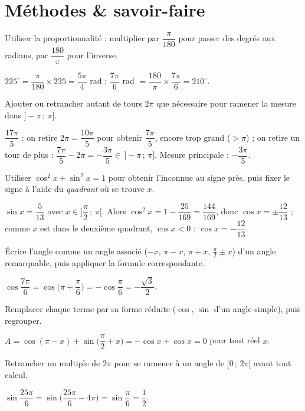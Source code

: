 \section{Méthodes \& savoir-faire}

Utiliser la proportionnalité : multiplier par $\dfrac{\pi}{180}$ pour passer des
degrés aux radians, par $\dfrac{180}{\pi}$ pour l'inverse.
\begin{exemple}
$225^\circ=\dfrac{\pi}{180}\times 225=\dfrac{5\pi}{4}$ rad ;
$\dfrac{7\pi}{6}$ rad $=\dfrac{180}{\pi}\times\dfrac{7\pi}{6}=210^\circ$.
\end{exemple}

Ajouter ou retrancher autant de tours $2\pi$ que nécessaire pour ramener la mesure
dans $]-\pi\,;\,\pi]$.
\begin{exemple}
$\dfrac{17\pi}{5}$ : on retire $2\pi=\dfrac{10\pi}{5}$ pour obtenir
$\dfrac{7\pi}{5}$, encore trop grand ($>\pi$) ; on retire un tour de plus :
$\dfrac{7\pi}{5}-2\pi=-\dfrac{3\pi}{5}\in\,]-\pi\,;\,\pi]$. Mesure principale :
$-\dfrac{3\pi}{5}$.
\end{exemple}

Utiliser $\cos^2 x+\sin^2 x=1$ pour obtenir l'inconnue au signe près, puis fixer
le signe à l'aide du \emph{quadrant} où se trouve $x$.
\begin{exemple}
$\sin x=\dfrac{5}{13}$ avec $x\in\Big]\dfrac{\pi}{2}\,;\,\pi\Big[$. Alors
$\cos^2 x=1-\dfrac{25}{169}=\dfrac{144}{169}$, donc $\cos x=\pm\dfrac{12}{13}$ ;
comme $x$ est dans le deuxième quadrant, $\cos x<0$ : $\cos x=-\dfrac{12}{13}$.
\end{exemple}

Écrire l'angle comme un angle associé ($-x$, $\pi-x$, $\pi+x$, $\tfrac{\pi}{2}\pm x$)
d'un angle remarquable, puis appliquer la formule correspondante.
\begin{exemple}
$\cos\dfrac{7\pi}{6}=\cos\Big(\pi+\dfrac{\pi}{6}\Big)=-\cos\dfrac{\pi}{6}=-\dfrac{\sqrt3}{2}$.
\end{exemple}

Remplacer chaque terme par sa forme réduite ($\cos$, $\sin$ d'un angle simple),
puis regrouper.
\begin{exemple}
$A=\cos(\pi-x)+\sin\!\Big(\dfrac{\pi}{2}+x\Big)=-\cos x+\cos x=0$ pour tout réel $x$.
\end{exemple}

Retrancher un multiple de $2\pi$ pour se ramener à un angle de $[0\,;\,2\pi[$ avant
tout calcul.
\begin{exemple}
$\sin\dfrac{25\pi}{6}=\sin\Big(\dfrac{25\pi}{6}-4\pi\Big)=\sin\dfrac{\pi}{6}=\dfrac12$.
\end{exemple}
